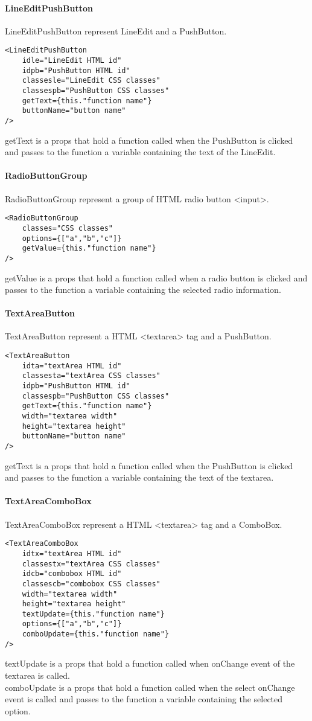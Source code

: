 \begin{flushleft}
    \paragraph{LineEditPushButton}
LineEditPushButton represent LineEdit and a PushButton.
\begin{verbatim}
<LineEditPushButton
    idle="LineEdit HTML id"
    idpb="PushButton HTML id"
    classesle="LineEdit CSS classes"
    classespb="PushButton CSS classes"
    getText={this."function name"}
    buttonName="button name"
/>
\end{verbatim}
getText is a props that hold a function called when the PushButton is clicked and passes to the function a variable containing the text of the LineEdit.

    \paragraph{RadioButtonGroup}
RadioButtonGroup represent a group of HTML radio button <input>.
\begin{verbatim}
<RadioButtonGroup
    classes="CSS classes"
    options={["a","b","c"]}
    getValue={this."function name"}
/>
\end{verbatim}
getValue is a props that hold a function called when a radio button is clicked and passes to the function a variable containing the selected radio information.

    \paragraph{TextAreaButton}
TextAreaButton represent a HTML <textarea> tag and a PushButton.
\begin{verbatim}
<TextAreaButton
    idta="textArea HTML id"
    classesta="textArea CSS classes"
    idpb="PushButton HTML id"
    classespb="PushButton CSS classes"
    getText={this."function name"}
    width="textarea width"
    height="textarea height"
    buttonName="button name"
/>
\end{verbatim}
getText is a props that hold a function called when the PushButton is clicked and passes to the function a variable containing the text of the textarea.

    \paragraph{TextAreaComboBox}
TextAreaComboBox represent a HTML <textarea> tag and a ComboBox.
\begin{verbatim}
<TextAreaComboBox
    idtx="textArea HTML id"
    classestx="textArea CSS classes"
    idcb="combobox HTML id"
    classescb="combobox CSS classes"
    width="textarea width"
    height="textarea height"
    textUpdate={this."function name"}
    options={["a","b","c"]}
    comboUpdate={this."function name"}
/>
\end{verbatim}
textUpdate is a props that hold a function called when onChange event of the textarea is called.\\
comboUpdate is a props that hold a function called when the select onChange event is called and passes to the function a variable containing the selected option.
\end{flushleft}

